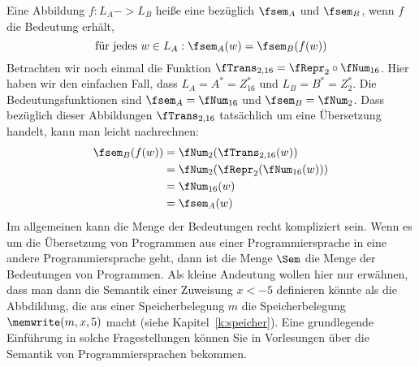 Eine Abbildung $f:L_A -> L_B$ heiße eine 
bezüglich $\fsem_A$ und $\fsem_B$, wenn $f$ die Bedeutung erhält, \dh
\[
\text{für jedes }  w\in L_A: \fsem_A(w) = \fsem_B(f(w))
\]
%
Betrachten wir noch einmal die Funktion $\fTrans_{2,16}=\fRepr_2 \circ
\fNum_{16}$. 
%
Hier haben wir den einfachen Fall, dass $L_A=A^*=Z_{16}^*$
und $L_B=B^*=Z_2^*$.
%
Die Bedeutungsfunktionen sind $\fsem_A=\fNum_{16}$
und $\fsem_B=\fNum_2$.
%
Dass bezüglich dieser Abbildungen $\fTrans_{2,16}$
tatsächlich um eine Übersetzung handelt, kann man leicht nachrechnen:
\begin{align*}
  \fsem_B(f(w)) &= \fNum_2(\fTrans_{2,16}(w)) \\
  &= \fNum_2(\fRepr_2 (\fNum_{16}(w))) \\
  &= \fNum_{16}(w) \\
  &= \fsem_A(w)
\end{align*}
%
Im allgemeinen kann die Menge der Bedeutungen recht kompliziert
sein. 
%
Wenn es um die Übersetzung von Programmen aus einer Programmiersprache
in eine andere Programmiersprache geht, dann ist die Menge $\Sem$
die Menge der Bedeutungen von Programmen. 
%
Als kleine Andeutung wollen hier nur erwähnen, dass man dann \zB die
Semantik einer Zuweisung $x <- 5$
definieren könnte als die Abbdildung, die aus einer Speicherbelegung
$m$ die Speicherbelegung $\memwrite(m,x,5)$
macht (siehe Kapitel~\ref{k:speicher}).
%
Eine grundlegende Einführung in solche Fragestellungen können Sie in
Vorlesungen über die Semantik von Programmiersprachen bekommen.

